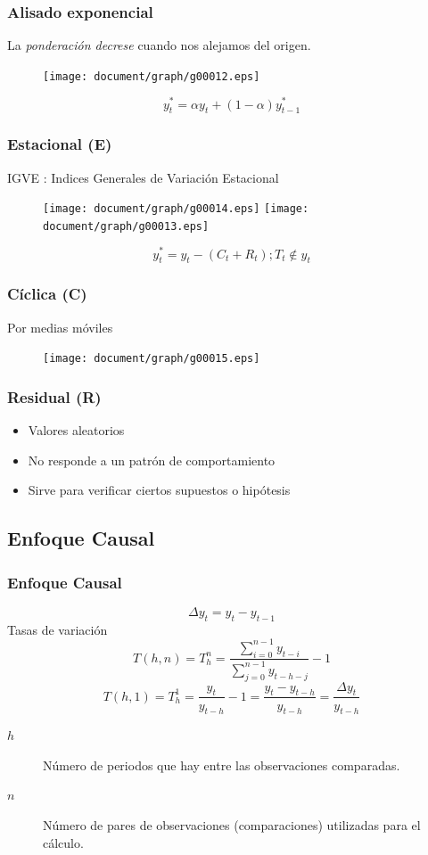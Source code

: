 \documentclass{beamer}
\begin{document}
\begin{frame}
\frametitle{Alisado exponencial}
La \emph{ponderación decrese} cuando nos alejamos del origen.
\begin{figure}
\texttt{[image: document/graph/g00012.eps]}
\end{figure}
\begin{equation}
y_t^* = \alpha y_t + (1-\alpha) y_{t-1}^*
\end{equation}
\end{frame}

\begin{frame}
\frametitle{Estacional (E)}
IGVE : Indices Generales de Variación Estacional
\begin{figure}
\texttt{[image: document/graph/g00014.eps]}
\texttt{[image: document/graph/g00013.eps]}
\end{figure}
\begin{equation}
y_t^* = y_t - (C_t + R_t); T_t \not \in y_t
\end{equation}
\end{frame}

\begin{frame}
\frametitle{Cíclica (C)}
Por medias móviles
\begin{figure}
\texttt{[image: document/graph/g00015.eps]}
\end{figure}
\end{frame}

\begin{frame}
\frametitle{Residual (R)}
\begin{itemize}
\item Valores aleatorios
\item No responde a un patrón de comportamiento
\item Sirve para verificar ciertos supuestos o hipótesis
\end{itemize}
\end{frame}


\subsection{Enfoque Causal}
\begin{frame}
\frametitle{Enfoque Causal}
\begin{equation}
\Delta y_t = y_t - y_{t-1}
\end{equation}
Tasas de variación
\begin{equation}
T(h,n) = T_h^n = \frac{\sum_{i=0}^{n-1}y_{t-i}}{\sum_{j=0}^{n-1}y_{t-h-j}}-1
\end{equation}
\begin{equation}
T(h,1) = T_h^1 = \frac{y_t}{y_{t-h}} -1 = \displaystyle\frac{y_t - y_{t-h}}{y_{t-h}} = \displaystyle\frac{\Delta y_t}{y_{t-h}}
\end{equation}
\begin{description}
\item[$h$] Número de periodos que hay entre las observaciones comparadas.
\item[$n$] Número de pares de observaciones (comparaciones) utilizadas para el cálculo.
\end{description}
\end{frame}
\end{document}
